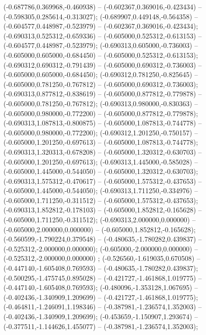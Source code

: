  (-0.687786,0.369968,-0.460938) -- (-0.602367,0.369016,-0.423434) -- (-0.598305,0.285614,-0.313027);
 (-0.689907,0.449148,-0.564358) -- (-0.604577,0.448987,-0.523979) -- (-0.602367,0.369016,-0.423434);
 (-0.690313,0.525312,-0.659336) -- (-0.605000,0.525312,-0.613153) -- (-0.604577,0.448987,-0.523979);
 (-0.690313,0.605000,-0.736003) -- (-0.605000,0.605000,-0.684450) -- (-0.605000,0.525312,-0.613153);
 (-0.690312,0.690312,-0.791439) -- (-0.605000,0.690312,-0.736003) -- (-0.605000,0.605000,-0.684450);
 (-0.690312,0.781250,-0.825645) -- (-0.605000,0.781250,-0.767812) -- (-0.605000,0.690312,-0.736003);
 (-0.690313,0.877812,-0.838619) -- (-0.605000,0.877812,-0.779878) -- (-0.605000,0.781250,-0.767812);
 (-0.690313,0.980000,-0.830363) -- (-0.605000,0.980000,-0.772200) -- (-0.605000,0.877812,-0.779878);
 (-0.690313,1.087813,-0.800875) -- (-0.605000,1.087813,-0.744778) -- (-0.605000,0.980000,-0.772200);
 (-0.690312,1.201250,-0.750157) -- (-0.605000,1.201250,-0.697613) -- (-0.605000,1.087813,-0.744778);
 (-0.690313,1.320313,-0.678208) -- (-0.605000,1.320312,-0.630703) -- (-0.605000,1.201250,-0.697613);
 (-0.690313,1.445000,-0.585028) -- (-0.605000,1.445000,-0.544050) -- (-0.605000,1.320312,-0.630703);
 (-0.690313,1.575312,-0.470617) -- (-0.605000,1.575312,-0.437653) -- (-0.605000,1.445000,-0.544050);
 (-0.690313,1.711250,-0.334976) -- (-0.605000,1.711250,-0.311512) -- (-0.605000,1.575312,-0.437653);
 (-0.690313,1.852812,-0.178103) -- (-0.605000,1.852812,-0.165628) -- (-0.605000,1.711250,-0.311512);
 (-0.690313,2.000000,0.000000) -- (-0.605000,2.000000,0.000000) -- (-0.605000,1.852812,-0.165628);
 (-0.560599,-1.790224,0.379548) -- (-0.480635,-1.780282,0.439837) -- (-0.525312,-2.000000,0.000000);
 (-0.605000,-2.000000,0.000000) -- (-0.525312,-2.000000,0.000000) ;
 (-0.526560,-1.619035,0.670508) -- (-0.447140,-1.605408,0.769593) -- (-0.480635,-1.780282,0.439837);
 (-0.500295,-1.475745,0.895028) -- (-0.421727,-1.461868,1.019775) -- (-0.447140,-1.605408,0.769593);
 (-0.480096,-1.353128,1.067695) -- (-0.402436,-1.340909,1.209699) -- (-0.421727,-1.461868,1.019775);
 (-0.464811,-1.246091,1.198346) -- (-0.387981,-1.236574,1.352003) -- (-0.402436,-1.340909,1.209699);
 (-0.453659,-1.150907,1.293674) -- (-0.377511,-1.144626,1.455077) -- (-0.387981,-1.236574,1.352003);
